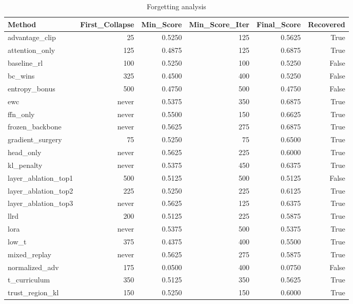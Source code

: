 \begin{table}[htbp]
\centering
\caption{Forgetting analysis}
\label{tab:forgetting}
\begin{tabular}{lrrrrr}
\toprule
\textbf{Method} & \textbf{First\_Collapse} & \textbf{Min\_Score} & \textbf{Min\_Score\_Iter} & \textbf{Final\_Score} & \textbf{Recovered} \\
\midrule
advantage\_clip & 25 & 0.5250 & 125 & 0.5625 & True \\
attention\_only & 125 & 0.4875 & 125 & 0.6875 & True \\
baseline\_rl & 100 & 0.5250 & 100 & 0.5250 & False \\
bc\_wins & 325 & 0.4500 & 400 & 0.5250 & False \\
entropy\_bonus & 500 & 0.4750 & 500 & 0.4750 & False \\
ewc & never & 0.5375 & 350 & 0.6875 & True \\
ffn\_only & never & 0.5500 & 150 & 0.6625 & True \\
frozen\_backbone & never & 0.5625 & 275 & 0.6875 & True \\
gradient\_surgery & 75 & 0.5250 & 75 & 0.6500 & True \\
head\_only & never & 0.5625 & 225 & 0.6000 & True \\
kl\_penalty & never & 0.5375 & 450 & 0.6375 & True \\
layer\_ablation\_top1 & 500 & 0.5125 & 500 & 0.5125 & False \\
layer\_ablation\_top2 & 225 & 0.5250 & 225 & 0.6125 & True \\
layer\_ablation\_top3 & never & 0.5625 & 125 & 0.6375 & True \\
llrd & 200 & 0.5125 & 225 & 0.5875 & True \\
lora & never & 0.5375 & 500 & 0.5375 & True \\
low\_t & 375 & 0.4375 & 400 & 0.5500 & True \\
mixed\_replay & never & 0.5625 & 275 & 0.5875 & True \\
normalized\_adv & 175 & 0.0500 & 400 & 0.0750 & False \\
t\_curriculum & 350 & 0.5125 & 350 & 0.5625 & True \\
trust\_region\_kl & 150 & 0.5250 & 150 & 0.6000 & True \\
\bottomrule
\end{tabular}
\end{table}